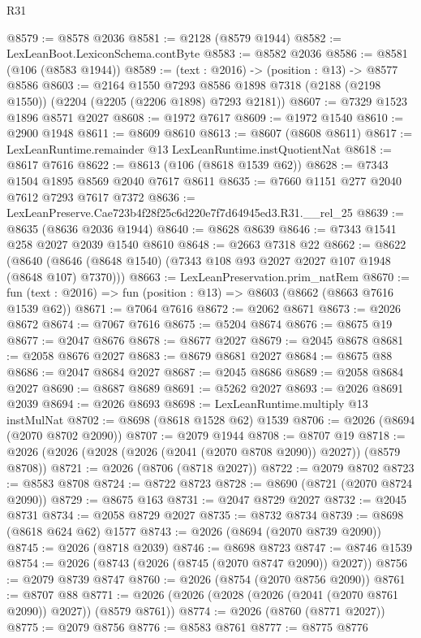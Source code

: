 \begin{lexlean}{R31}
\begin{coremodule}
@8579 := @8578 @2036
@8581 := @2128 (@8579 @1944)
@8582 := LexLeanBoot.LexiconSchema.contByte
@8583 := @8582 @2036
@8586 := @8581 (@106 (@8583 @1944))
@8589 := (text : @2016) -> (position : @13) -> @8577 @8586
@8603 := @2164
    @1550
    @7293
    @8586
    @1898
    @7318
    (@2188 (@2198 @1550))
    (@2204 (@2205 (@2206 @1898) @7293 @2181))
@8607 := @7329 @1523 @1896 @8571 @2027
@8608 := @1972 @7617
@8609 := @1972 @1540
@8610 := @2900 @1948
@8611 := @8609 @8610
@8613 := @8607 (@8608 @8611)
@8617 := LexLeanRuntime.remainder @13 LexLeanRuntime.instQuotientNat
@8618 := @8617 @7616
@8622 := @8613 (@106 (@8618 @1539 @62))
@8628 := @7343 @1504 @1895 @8569 @2040 @7617 @8611
@8635 := @7660 @1151 @277 @2040 @7612 @7293 @7617 @7372
@8636 := LexLeanPreserve.Cae723b4f28f25c6d220e7f7d64945ed3.R31.__rel_25
@8639 := @8635 (@8636 @2036 @1944)
@8640 := @8628 @8639
@8646 := @7343 @1541 @258 @2027 @2039 @1540 @8610
@8648 := @2663 @7318 @22
@8662 := @8622
    (@8640 (@8646 (@8648 @1540) (@7343 @108 @93 @2027 @2027 @107 @1948 (@8648 @107) @7370)))
@8663 := LexLeanPreservation.prim_natRem
@8670 := fun (text : @2016) => fun (position : @13) => @8603 (@8662 (@8663 @7616 @1539 @62))
@8671 := @7064 @7616
@8672 := @2062 @8671
@8673 := @2026 @8672
@8674 := @7067 @7616
@8675 := @5204 @8674
@8676 := @8675 @19
@8677 := @2047 @8676
@8678 := @8677 @2027
@8679 := @2045 @8678
@8681 := @2058 @8676 @2027
@8683 := @8679 @8681 @2027
@8684 := @8675 @88
@8686 := @2047 @8684 @2027
@8687 := @2045 @8686
@8689 := @2058 @8684 @2027
@8690 := @8687 @8689
@8691 := @5262 @2027
@8693 := @2026 @8691 @2039
@8694 := @2026 @8693
@8698 := LexLeanRuntime.multiply @13 instMulNat
@8702 := @8698 (@8618 @1528 @62) @1539
@8706 := @2026 (@8694 (@2070 @8702 @2090))
@8707 := @2079 @1944
@8708 := @8707 @19
@8718 := @2026 (@2026 (@2028 (@2026 (@2041 (@2070 @8708 @2090)) @2027)) (@8579 @8708))
@8721 := @2026 (@8706 (@8718 @2027))
@8722 := @2079 @8702
@8723 := @8583 @8708
@8724 := @8722 @8723
@8728 := @8690 (@8721 (@2070 @8724 @2090))
@8729 := @8675 @163
@8731 := @2047 @8729 @2027
@8732 := @2045 @8731
@8734 := @2058 @8729 @2027
@8735 := @8732 @8734
@8739 := @8698 (@8618 @624 @62) @1577
@8743 := @2026 (@8694 (@2070 @8739 @2090))
@8745 := @2026 (@8718 @2039)
@8746 := @8698 @8723
@8747 := @8746 @1539
@8754 := @2026 (@8743 (@2026 (@8745 (@2070 @8747 @2090)) @2027))
@8756 := @2079 @8739 @8747
@8760 := @2026 (@8754 (@2070 @8756 @2090))
@8761 := @8707 @88
@8771 := @2026 (@2026 (@2028 (@2026 (@2041 (@2070 @8761 @2090)) @2027)) (@8579 @8761))
@8774 := @2026 (@8760 (@8771 @2027))
@8775 := @2079 @8756
@8776 := @8583 @8761
@8777 := @8775 @8776

\end{coremodule}
\end{lexlean}
